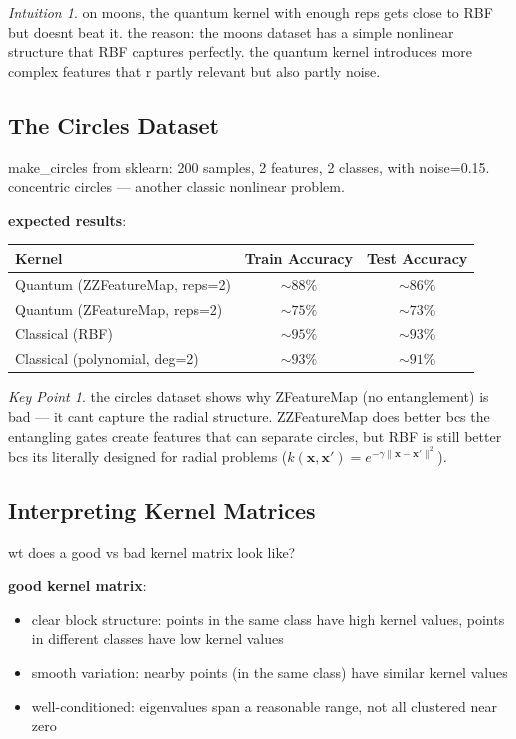 \documentclass[11pt,a4paper]{article}
\theoremstyle{definition}
\theoremstyle{remark}
\newtheorem*{intuition}{Intuition}
\newtheorem*{keypoint}{Key Point}
\begin{document}
\begin{intuition}
on moons, the quantum kernel with enough reps gets close to RBF but doesnt beat it. the reason: the moons dataset has a simple nonlinear structure that RBF captures perfectly. the quantum kernel introduces more complex features that r partly relevant but also partly noise.
\end{intuition}

\subsection{The Circles Dataset}

make\_circles from sklearn: 200 samples, 2 features, 2 classes, with noise=0.15. concentric circles --- another classic nonlinear problem.

\textbf{expected results}:
\begin{center}
\renewcommand{\arraystretch}{1.3}
\begin{tabular}{|l|c|c|}
\hline
\textbf{Kernel} & \textbf{Train Accuracy} & \textbf{Test Accuracy} \\
\hline
Quantum (ZZFeatureMap, reps=2) & $\sim 88\%$ & $\sim 86\%$ \\
\hline
Quantum (ZFeatureMap, reps=2) & $\sim 75\%$ & $\sim 73\%$ \\
\hline
Classical (RBF) & $\sim 95\%$ & $\sim 93\%$ \\
\hline
Classical (polynomial, deg=2) & $\sim 93\%$ & $\sim 91\%$ \\
\hline
\end{tabular}
\end{center}

\begin{keypoint}
the circles dataset shows why ZFeatureMap (no entanglement) is bad --- it cant capture the radial structure. ZZFeatureMap does better bcs the entangling gates create features that can separate circles, but RBF is still better bcs its literally designed for radial problems ($k(\mathbf{x}, \mathbf{x}') = e^{-\gamma \|\mathbf{x} - \mathbf{x}'\|^2}$).
\end{keypoint}

\subsection{Interpreting Kernel Matrices}

wt does a good vs bad kernel matrix look like?

\textbf{good kernel matrix}:
\begin{itemize}[leftmargin=*]
    \item clear block structure: points in the same class have high kernel values, points in different classes have low kernel values
    \item smooth variation: nearby points (in the same class) have similar kernel values
    \item well-conditioned: eigenvalues span a reasonable range, not all clustered near zero
\end{itemize}
\end{document}
